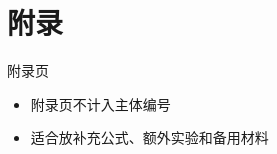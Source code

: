 \appendix
\section{附录}

\begin{frame}{附录页}
  \begin{itemize}
    \item 附录页不计入主体编号
    \item 适合放补充公式、额外实验和备用材料
  \end{itemize}
\end{frame}

\cxQAFrame
